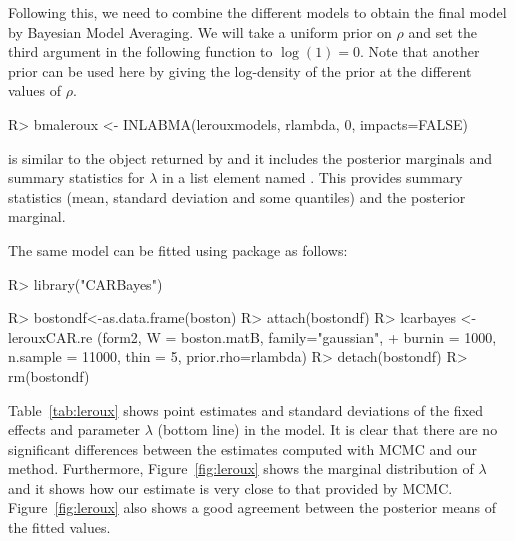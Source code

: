 \documentclass[article]{jss}
\begin{document}
Following this, we need to combine the different models to obtain the final
model by Bayesian Model Averaging. We will take a uniform prior on $\rho$ and
set the third argument in the following function to $\log(1)=0$. Note that
another prior can be used here by giving the log-density of the prior at the
different values of $\rho$.



\begin{Schunk}
\begin{Sinput}
R> bmaleroux <- INLABMA(lerouxmodels, rlambda, 0, impacts=FALSE)
\end{Sinput}
\end{Schunk}


\noindent
{} is similar to the object returned by  and it
includes the posterior marginals and summary statistics for $\lambda$
in a list element named . This provides summary statistics (mean,
standard deviation and some quantiles) and the posterior marginal.

The same model can be fitted using package  \citep{CARBayes:2013}
as follows:

\begin{Schunk}
\begin{Sinput}
R> library("CARBayes")
\end{Sinput}
\end{Schunk}
\begin{Schunk}
\begin{Sinput}
R> bostondf<-as.data.frame(boston)
R> attach(bostondf)
R> lcarbayes <-  lerouxCAR.re (form2, W = boston.matB, family="gaussian",
+     burnin = 1000,  n.sample = 11000, thin = 5, prior.rho=rlambda)
R> detach(bostondf)
R> rm(bostondf)
\end{Sinput}
\end{Schunk}


Table~\ref{tab:leroux} shows point estimates and standard deviations of the
fixed effects and parameter $\lambda$ (bottom line) in the model. It is clear
that there are no significant differences between the estimates computed with
MCMC and our method.  Furthermore, Figure~\ref{fig:leroux} shows the marginal
distribution of $\lambda$ and it shows how our estimate is very close to that
provided by MCMC. 
Figure~\ref{fig:leroux} also shows a good agreement between the posterior
means of the fitted values. 

\end{document}
